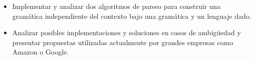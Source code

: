 \begin{itemize}
    \item Implementar y analizar dos algoritmos de parseo para construir una gramática independiente del contexto bajo una gramática y un lenguaje dado.
    \item Analizar posibles implementaciones y soluciones en casos de ambigüedad y presentar propuestas utilizadas actualmente por grandes empresas como Amazon o Google.
\end{itemize}